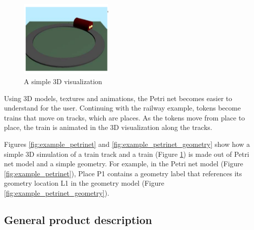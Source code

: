 \begin{figure}[htp]
\begin{center}
  \includegraphics[width=0.4\textwidth]{image/3d.png}
  \caption{A simple 3D visualization}
  \label{fig:example_3d}
\end{center}
\end{figure}

%

Using 3D models, textures and animations, the Petri net becomes easier to understand for the user. Continuing with the railway example, tokens become trains that move on tracks, which are places. As the tokens move from place to place, the train is animated in the 3D visualization along the tracks.

Figures \ref{fig:example_petrinet} and \ref{fig:example_petrinet_geometry} show how a simple 3D simulation of a train track and a train (Figure \ref{fig:example_3d}) is made out of Petri net model and a simple geometry. For example, in the Petri net model (Figure \ref{fig:example_petrinet}), Place P1 contains a geometry label that references its geometry location L1 in the geometry model (Figure \ref{fig:example_petrinet_geometry}).

\newpage

\subsection{General product description}

